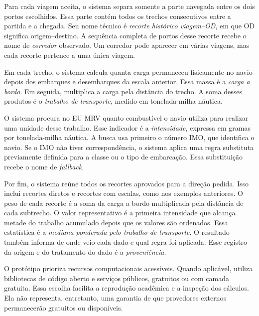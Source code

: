 Para cada viagem aceita, o sistema separa somente a parte navegada entre os dois portos escolhidos. Essa parte contém todos os trechos consecutivos entre a partida e a chegada. Seu nome técnico é \emph{recorte histórico viagem--OD}, em que OD significa origem--destino. A sequência completa de portos desse recorte recebe o nome de \emph{corredor} observado. Um corredor pode aparecer em várias viagens, mas cada recorte pertence a uma única viagem.

Em cada trecho, o sistema calcula quanta carga permaneceu fisicamente no navio depois dos embarques e desembarques da escala anterior. Essa massa é a \emph{carga a bordo}. Em seguida, multiplica a carga pela distância do trecho. A soma desses produtos é o \emph{trabalho de transporte}, medido em tonelada-milha náutica.

O sistema procura no EU MRV quanto combustível o navio utiliza para realizar uma unidade desse trabalho. Esse indicador é a \emph{intensidade}, expressa em gramas por tonelada-milha náutica. A busca usa primeiro o número IMO, que identifica o navio. Se o IMO não tiver correspondência, o sistema aplica uma regra substituta previamente definida para a classe ou o tipo de embarcação. Essa substituição recebe o nome de \emph{fallback}.

Por fim, o sistema reúne todos os recortes aprovados para a direção pedida. Isso inclui recortes diretos e recortes com escalas, como nos exemplos anteriores. O peso de cada recorte é a soma da carga a bordo multiplicada pela distância de cada subtrecho. O valor representativo é a primeira intensidade que alcança metade do trabalho acumulado depois que os valores são ordenados. Essa estatística é a \emph{mediana ponderada pelo trabalho de transporte}. O resultado também informa de onde veio cada dado e qual regra foi aplicada. Esse registro da origem e do tratamento do dado é a \emph{proveniência}.

O protótipo prioriza recursos computacionais acessíveis. Quando aplicável, utiliza bibliotecas de código aberto e serviços públicos, gratuitos ou com camada gratuita. Essa escolha facilita a reprodução acadêmica e a inspeção dos cálculos. Ela não representa, entretanto, uma garantia de que provedores externos permanecerão gratuitos ou disponíveis.


